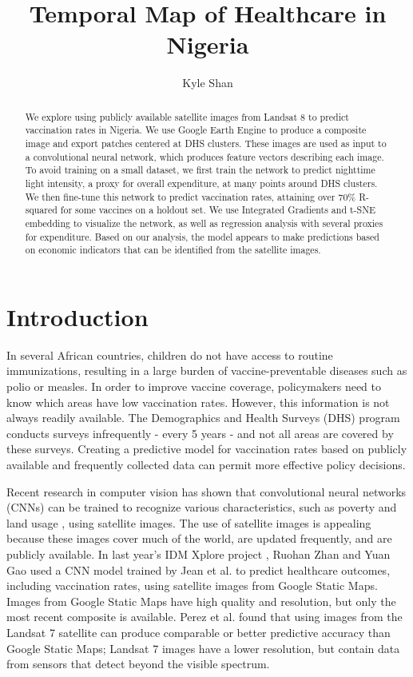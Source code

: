 \documentclass[]{article}
\title{Temporal Map of Healthcare in Nigeria}
\author{Kyle Shan}
\begin{document}
\maketitle

\begin{abstract}
We explore using publicly available satellite images from Landsat 8 to predict vaccination rates in Nigeria. We use Google Earth Engine to produce a composite image and export patches centered at DHS clusters. These images are used as input to a convolutional neural network, which produces feature vectors describing each image. To avoid training on a small dataset, we first train the network to predict nighttime light intensity, a proxy for overall expenditure, at many points around DHS clusters. We then fine-tune this network to predict vaccination rates, attaining over 70\% R-squared for some vaccines on a holdout set. We use Integrated Gradients and t-SNE embedding to visualize the network, as well as regression analysis with several proxies for expenditure. Based on our analysis, the model appears to make predictions based on economic indicators that can be identified from the satellite images.
\end{abstract}

\section{Introduction}
In several African countries, children do not have access to routine immunizations, resulting in a large burden of vaccine-preventable diseases such as polio or measles. In order to improve vaccine coverage, policymakers need to know which areas have low vaccination rates. However, this information is not always readily available. The Demographics and Health Surveys (DHS) program \cite{dhs2014} conducts surveys infrequently - every 5 years  - and not all areas are covered by these surveys. Creating a predictive model for vaccination rates based on publicly available and frequently collected data can permit more effective policy decisions.

Recent research in computer vision has shown that convolutional neural networks (CNNs) can be trained to recognize various characteristics, such as poverty \cite{jean2016combining} and land usage \cite{castelluccio2015land}, using satellite images. The use of satellite images is appealing because these images cover much of the world, are updated frequently, and are publicly available. In last year's IDM Xplore project \cite{zhan2019}, Ruohan Zhan and Yuan Gao used a CNN model trained by Jean et al. \cite{jean2016combining} to predict healthcare outcomes, including vaccination rates, using satellite images from Google Static Maps. Images from Google Static Maps have high quality and resolution, but only the most recent composite is available. Perez et al. \cite{perez2017poverty} found that using images from the Landsat 7 satellite can produce comparable or better predictive accuracy than Google Static Maps; Landsat 7 images have a lower resolution, but contain data from sensors that detect beyond the visible spectrum.
\end{document}
